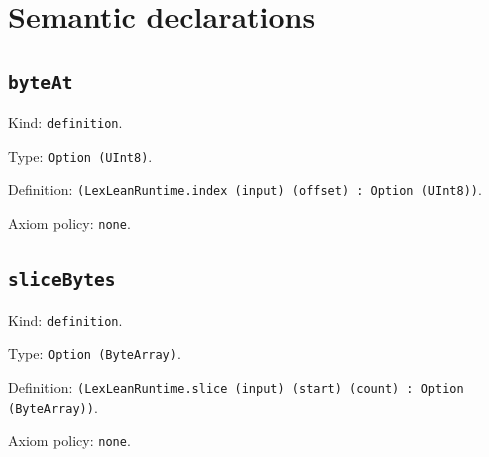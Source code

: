 \documentclass[11pt]{article}
\begin{document}
\section*{Semantic declarations}
\subsection*{\texttt{byteAt}}
\noindent Kind: \texttt{definition}.\par
\noindent Type: \texttt{Option (UInt8)}.\par
\noindent Definition: \texttt{(LexLeanRuntime.index (input) (offset) : Option (UInt8))}.\par
\noindent Axiom policy: \texttt{none}.\par
\subsection*{\texttt{sliceBytes}}
\noindent Kind: \texttt{definition}.\par
\noindent Type: \texttt{Option (ByteArray)}.\par
\noindent Definition: \texttt{(LexLeanRuntime.slice (input) (start) (count) : Option (ByteArray))}.\par
\noindent Axiom policy: \texttt{none}.\par
\end{document}
